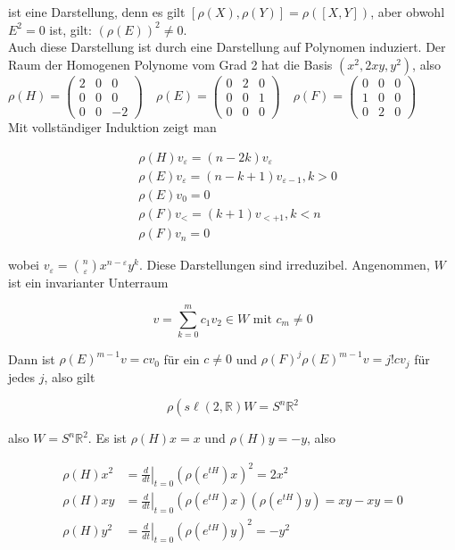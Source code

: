\documentclass[10pt, letterpaper]{article}
\begin{document}
ist eine Darstellung, denn es gilt $[\rho(X), \rho(Y)]=\rho([X, Y])$, aber obwohl $E^{2}=0$ ist, gilt: $(\rho(E))^{2} \neq 0$.\\
Auch diese Darstellung ist durch eine Darstellung auf Polynomen induziert. Der Raum der Homogenen Polynome vom Grad 2 hat die Basis $\left(x^{2}, 2 x y, y^{2}\right)$, also\\
$\rho(H)=\left(\begin{array}{ccc}2 & 0 & 0 \\ 0 & 0 & 0 \\ 0 & 0 & -2\end{array}\right) \quad \rho(E)=\left(\begin{array}{ccc}0 & 2 & 0 \\ 0 & 0 & 1 \\ 0 & 0 & 0\end{array}\right) \quad \rho(F)=\left(\begin{array}{ccc}0 & 0 & 0 \\ 1 & 0 & 0 \\ 0 & 2 & 0\end{array}\right)$\\
Mit vollständiger Induktion zeigt man

$$
\begin{aligned}
& \rho(H) v_{\varepsilon}=(n-2 k) v_{\varepsilon} \\
& \rho(E) v_{\varepsilon}=(n-k+1) v_{\varepsilon-1}, k>0 \\
& \rho(E) v_{0}=0 \\
& \rho(F) v_{<}=(k+1) v_{<+1}, k<n \\
& \rho(F) v_{n}=0
\end{aligned}
$$

wobei $v_{\varepsilon}=\binom{n}{\varepsilon} x^{n-\varepsilon} y^{k}$. Diese Darstellungen sind irreduzibel. Angenommen, $W$ ist ein invarianter Unterraum

$$
v=\sum_{k=0}^{m} c_{1} v_{2} \in W \text { mit } c_{m} \neq 0
$$

Dann ist $\rho(E)^{m-1} v=c v_{0}$ für ein $c \neq 0$ und $\rho(F)^{j} \rho(E)^{m-1} v=j!c v_{j}$ für jedes $j$, also gilt

$$
\rho\left(s \ell(2, \mathbb{R}) W=S^{n} \mathbb{R}^{2}\right.
$$

also $W=S^{n} \mathbb{R}^{2}$. Es ist $\rho(H) x=x$ und $\rho(H) y=-y$, also

$$
\begin{aligned}
\rho(H) x^{2} & =\left.\frac{d}{d t}\right|_{t=0}\left(\rho\left(e^{t H}\right) x\right)^{2}=2 x^{2} \\
\rho(H) x y & =\left.\frac{d}{d t}\right|_{t=0}\left(\rho\left(e^{t H}\right) x\right)\left(\rho\left(e^{t H}\right) y\right)=x y-x y=0 \\
\rho(H) y^{2} & =\left.\frac{d}{d t}\right|_{t=0}\left(\rho\left(e^{t H}\right) y\right)^{2}=-y^{2}
\end{aligned}
$$
\end{document}
